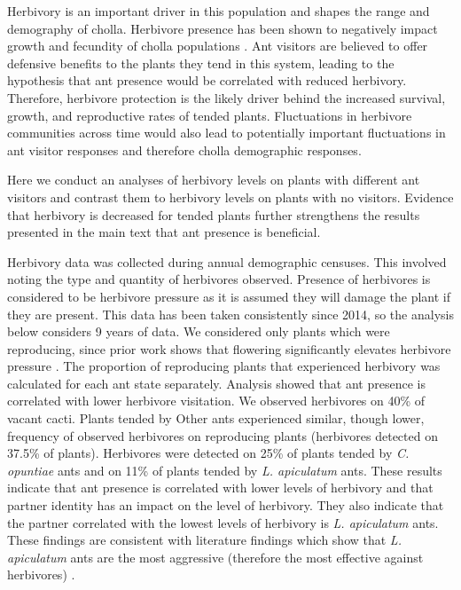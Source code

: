\documentclass[11pt]{article}
\begin{document}
Herbivory is an important driver in this population and shapes the range and demography of cholla.
Herbivore presence has been shown to negatively impact growth and fecundity of cholla populations \citep{Miller2009}.
Ant visitors are believed to offer defensive benefits to the plants they tend in this system, leading to the hypothesis that ant presence would be correlated with reduced herbivory.
Therefore, herbivore protection is the likely driver behind the increased survival, growth, and reproductive rates of tended plants. 
Fluctuations in herbivore communities across time would also lead to potentially important fluctuations in ant visitor responses and therefore cholla demographic responses.

Here we conduct  an analyses of herbivory levels on plants with different ant visitors and contrast them to herbivory levels on plants with no visitors.
Evidence that herbivory is decreased for tended plants further strengthens the results presented in the main text that ant presence is beneficial.

Herbivory data was collected during annual demographic censuses. 
This involved noting the type and quantity of herbivores observed. 
Presence of herbivores is considered to be herbivore pressure as it is assumed they will damage the plant if they are present.
This data has been taken consistently since 2014, so the analysis below considers 9 years of data.
We considered only plants which were reproducing, since prior work shows that flowering significantly elevates herbivore pressure \citep{Miller2006}.
The proportion of reproducing plants that experienced herbivory was calculated for each ant state separately.
Analysis showed that ant presence is correlated with lower herbivore visitation.
We observed herbivores on 40\% of vacant cacti.
Plants tended by Other ants experienced similar, though lower, frequency of observed herbivores on reproducing plants (herbivores detected on 37.5\% of plants).
Herbivores were detected on 25\% of plants tended by \textit{C. opuntiae} ants and on 11\% of plants tended by \textit{L. apiculatum} ants.
These results indicate that ant presence is correlated with lower levels of herbivory and that partner identity has an impact on the level of herbivory.
They also indicate that the partner correlated with the lowest levels of herbivory is \textit{L. apiculatum} ants.
These findings are consistent with literature findings which show that \textit{L. apiculatum} ants are the most aggressive (therefore the most effective against herbivores) \citep{Miller2007}.
\end{document}
